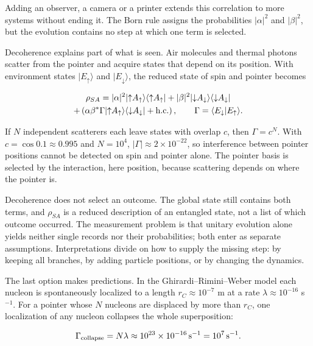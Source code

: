 \documentclass[11pt,oneside]{book}
\newenvironment{centeredalign}{\[\begin{gathered}[c]}{\end{gathered}\]}
\begin{document}
Adding an observer, a camera or a printer extends this correlation to more systems without ending it. The Born rule assigns the probabilities \(|\alpha|^2\) and \(|\beta|^2\), but the evolution contains no step at which one term is selected.

Decoherence explains part of what is seen. Air molecules and thermal photons scatter from the pointer and acquire states that depend on its position. With environment states \(|E_\uparrow\rangle\) and \(|E_\downarrow\rangle\), the reduced state of spin and pointer becomes

\begin{centeredalign}
\rho_{SA}=|\alpha|^2|{\uparrow}A_\uparrow\rangle\langle{\uparrow}A_\uparrow|
+|\beta|^2|{\downarrow}A_\downarrow\rangle\langle{\downarrow}A_\downarrow|\\
+\left(\alpha\beta^*\Gamma|{\uparrow}A_\uparrow\rangle\langle{\downarrow}A_\downarrow|+{\rm h.c.}\right),
\qquad \Gamma=\langle E_\downarrow|E_\uparrow\rangle.
\end{centeredalign}

If \(N\) independent scatterers each leave states with overlap \(c\), then \(\Gamma=c^N\). With \(c=\cos0.1\approx0.995\) and \(N=10^4\), \(|\Gamma|\approx2\times10^{-22}\), so interference between pointer positions cannot be detected on spin and pointer alone. The pointer basis is selected by the interaction, here position, because scattering depends on where the pointer is.

Decoherence does not select an outcome. The global state still contains both terms, and \(\rho_{SA}\) is a reduced description of an entangled state, not a list of which outcome occurred. The measurement problem is that unitary evolution alone yields neither single records nor their probabilities; both enter as separate assumptions. Interpretations divide on how to supply the missing step: by keeping all branches, by adding particle positions, or by changing the dynamics.

The last option makes predictions. In the Ghirardi--Rimini--Weber model each nucleon is spontaneously localized to a length \(r_C\approx10^{-7}\) m at a rate \(\lambda\approx10^{-16}\) s\(^{-1}\). For a pointer whose \(N\) nucleons are displaced by more than \(r_C\), one localization of any nucleon collapses the whole superposition:

\begin{centeredalign}
\Gamma_{\rm collapse}=N\lambda\approx10^{23}\times10^{-16}\,{\rm s^{-1}}=10^{7}\,{\rm s^{-1}}.
\end{centeredalign}
\end{document}
